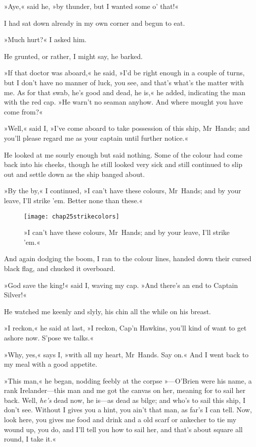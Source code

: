 »Aye,« said he, »by thunder, but I wanted some o' that!«

I had sat down already in my own corner and begun to eat.

»Much hurt?« I asked him.

He grunted, or rather, I might say, he barked.

»If that doctor was aboard,« he said, »I'd be right enough in a couple of turns, but I don't have no manner of luck, you see, and that's what's the matter with me. As for that swab, he's good and dead, he is,« he added, indicating the man with the red cap. »He warn't no seaman anyhow. And where mought you have come from?«

»Well,« said I, »I've come aboard to take possession of this ship, Mr~Hands; and you'll please regard me as your captain until further notice.«

He looked at me sourly enough but said nothing. Some of the colour had come back into his cheeks, though he still looked very sick and still continued to slip out and settle down as the ship banged about.

»By the by,« I continued, »I can't have these colours, Mr~Hands; and by your leave, I'll strike 'em. Better none than these.«

    \begin{figure}[p]
\centering
\texttt{[image: chap25strikecolors]}
\caption[»I can't have these colours, Mr~Hands«]{»I can't have these colours, Mr~Hands; and by your leave, I'll strike 'em.«}
\end{figure}   

And again dodging the boom, I ran to the colour lines, handed down their cursed black flag, and chucked it overboard.

»God save the king!« said I, waving my cap. »And there's an end to Captain Silver!«

He watched me keenly and slyly, his chin all the while on his breast.

»I reckon,« he said at last, »I reckon, Cap'n Hawkins, you'll kind of want to get ashore now. S'pose we talks.«

»Why, yes,« says I, »with all my heart, Mr~Hands. Say on.« And I went back to my meal with a good appetite.

»This man,« he began, nodding feebly at the corpse »—O'Brien were his name, a rank Irelander—this man and me got the canvas on her, meaning for to sail her back. Well, \textit{he's} dead now, he is—as dead as bilge; and who's to sail this ship, I don't see. Without I gives you a hint, you ain't that man, as far's I can tell. Now, look here, you gives me food and drink and a old scarf or ankecher to tie my wound up, you do, and I'll tell you how to sail her, and that's about square all round, I take it.«

